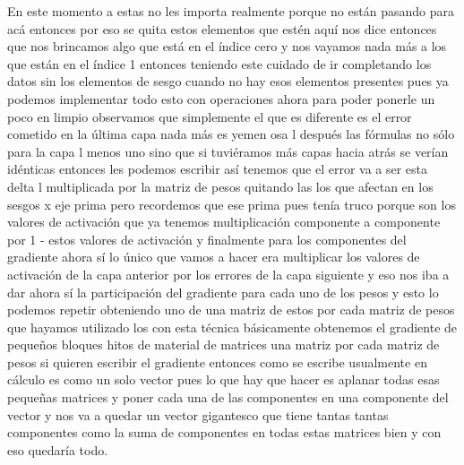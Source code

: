 En este momento a estas no les importa realmente porque no están pasando para acá entonces por eso se quita estos elementos que estén aquí nos dice entonces que nos brincamos algo que está en el índice cero y nos vayamos nada más a los que están en el índice 1 entonces teniendo este cuidado de ir completando los datos sin los elementos de sesgo cuando no hay esos elementos presentes pues ya podemos implementar todo esto con operaciones ahora para poder ponerle un poco en limpio observamos que simplemente el que es diferente es el error cometido en la última capa nada más es yemen osa l después las fórmulas no sólo para la capa l menos uno sino que si tuviéramos más capas hacia atrás se verían idénticas entonces les podemos escribir así tenemos que el error va a ser esta delta l multiplicada por la matriz de pesos quitando las los que afectan en los sesgos x eje prima pero recordemos que ese prima pues tenía truco porque son los valores de activación que ya tenemos multiplicación componente a componente por 1 - estos valores de activación y finalmente para los componentes del gradiente ahora sí lo único que vamos a hacer era multiplicar los valores de activación de la capa anterior por los errores de la capa siguiente y eso nos iba a dar ahora sí la participación del gradiente para cada uno de los pesos y esto lo podemos repetir obteniendo uno de una matriz de estos por cada matriz de pesos que hayamos utilizado los con esta técnica básicamente obtenemos el gradiente de pequeños bloques hitos de material de matrices una matriz por cada matriz de pesos si quieren escribir el gradiente entonces como se escribe usualmente en cálculo es como un solo vector pues lo que hay que hacer es aplanar todas esas pequeñas matrices y poner cada una de las componentes en una componente del vector y nos va a quedar un vector gigantesco que tiene tantas tantas componentes como la suma de componentes en todas estas matrices bien y con eso quedaría todo. 
